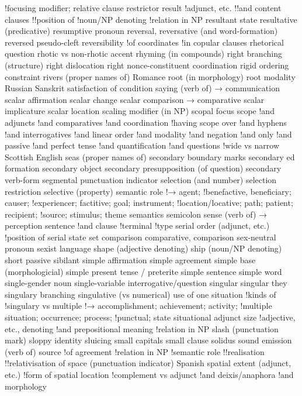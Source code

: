 !focusing modifier; relative clause
restrictor
result
!adjunct, etc.
!!and content clauses
!!position of
!noun/NP denoting
!relation in NP
resultant state
resultative (predicative)
resumptive pronoun
reversal, reversative (and word-formation)
reversed pseudo-cleft
reversibility
!of coordinates
!in copular clauses
rhetorical question
rhotic vs non-rhotic accent
rhyming (in compounds)
right branching (structure)
right dislocation
right nonce-constituent coordination
rigid ordering constraint
rivers (proper names of)
Romance
root (in morphology)
root modality
Russian
Sanskrit
satisfaction of condition
saying (verb of) → communication
scalar affirmation
scalar change
scalar comparison → comparative
scalar implicature
scalar location
scaling modifier (in NP)
scopal focus
scope
!and adjuncts
!and comparatives
!and coordination
!having scope over
!and hyphens
!and interrogatives
!and linear order
!and modality
!and negation
!and only
!and passive
!and perfect tense
!and quantification
!and questions
!wide vs narrow
Scottish English
seas (proper names of)
secondary boundary marks
secondary ed formation
secondary object
secondary presupposition (of question)
secondary verb-form
segmental punctuation indicator
selection (and number)
selection restriction
selective (property)
semantic role
!→ agent;
!benefactive, beneficiary; causer;
!experiencer; factitive; goal; instrument;
!location/locative; path; patient; recipient;
!source; stimulus; theme
semantics
semicolon
sense (verb of) → perception
sentence
!and clause
!terminal
!type
serial order (adjunct, etc.)
!position of
serial state
set comparison comparative, comparison
sex-neutral pronoun
sexist language
shape (adjective denoting)
ship (noun/NP denoting)
short passive
sibilant
simple affirmation
simple agreement
simple base (morphologicial)
simple present tense / preterite
simple sentence
simple word
single-gender noun
single-variable interrogative/question
singular
singular they
singulary branching
singulative (vs numerical) use of one
situation
!kinds of
!singulary vs multiple
!→ accomplishment; achievement; activity;
!multiple situation; occurrence; process;
!punctual; state
situational adjunct
size
!adjective, etc., denoting
!and prepositional meaning
!relation in NP
slash (punctuation mark)
sloppy identity
sluicing
small capitals
small clause
solidus
sound emission (verb of)
source
!of agreement
!relation in NP
!semantic role
!!realisation
!!relativisation of
space (punctuation indicator)
Spanish
spatial extent (adjunct, etc.)
!form of
spatial location
!complement vs adjunct
!and deixis/anaphora
!and morphology
